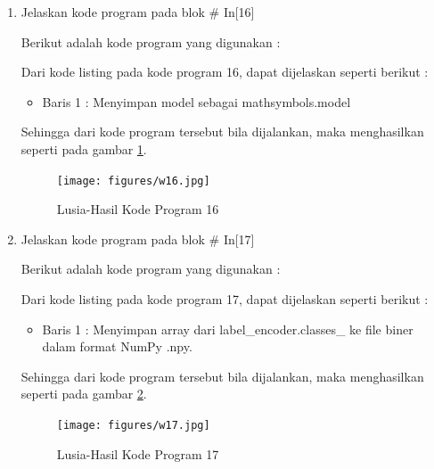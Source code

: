 \begin{enumerate}
\item Jelaskan kode program pada blok \# In[16]
\par Berikut adalah kode program yang digunakan :
	
	\par Dari kode listing pada kode program 16, dapat dijelaskan seperti berikut :
	\begin{itemize}
	\item Baris 1	: Menyimpan model sebagai mathsymbols.model
	\end{itemize}
	\par Sehingga dari kode program tersebut bila dijalankan, maka menghasilkan seperti pada gambar \ref{7B16}.
		\begin{figure}[!hbtp]
		\centering
		\texttt{[image: figures/w16.jpg]}
		\caption{Lusia-Hasil Kode Program 16}
		\label{7B16}
		\end{figure}

\item Jelaskan kode program pada blok \# In[17]
	\par Berikut adalah kode program yang digunakan :
	
	\par Dari kode listing pada kode program 17, dapat dijelaskan seperti berikut :
	\begin{itemize}
	\item Baris 1	: Menyimpan array dari label\_encoder.classes\_ ke file biner dalam format NumPy .npy.
	\end{itemize}
	\par Sehingga dari kode program tersebut bila dijalankan, maka menghasilkan seperti pada gambar \ref{7B17}.
		\begin{figure}[!hbtp]
		\centering
		\texttt{[image: figures/w17.jpg]}
		\caption{Lusia-Hasil Kode Program 17}
		\label{7B17}
		\end{figure}


\end{enumerate}
